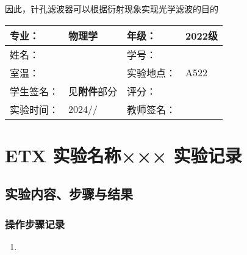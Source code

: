 \documentclass[dvipsnames, svgnames,a4paper,11pt]{article}
\begin{document}
因此，针孔滤波器可以根据衍射现象实现光学滤波的目的
	
	
	
	\clearpage
	
	\begin{table}
		\renewcommand\arraystretch{1.7}
		\centering
		\begin{tabularx}{\textwidth}{|X|X|X|X|}
			\hline
			专业： & 物理学 & 年级： & 2022级 \\
			\hline
			姓名： &  & 学号： & \\
			\hline
			室温： &  & 实验地点： & A522 \\
			\hline
			学生签名：& 见\textbf{附件}部分 & 评分： &\\
			\hline
			实验时间：& 2024// & 教师签名：&\\
			\hline
		\end{tabularx}
	\end{table}
	
	\section{ETX 实验名称×××  \quad\heiti 实验记录}
	
	\subsection{实验内容、步骤与结果}
	
	\subsubsection{操作步骤记录}
	\begin{enumerate}
		\item 
	\end{enumerate}	
	
\end{document}
